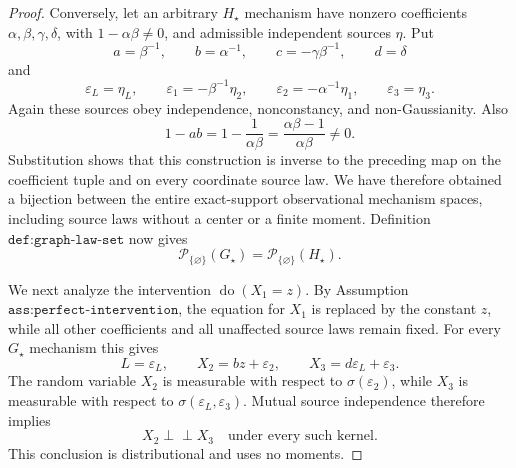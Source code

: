 \documentclass{article}
\begin{document}
\begin{proof}
Conversely, let an arbitrary \(H_\star\) mechanism have nonzero coefficients \(\alpha,\beta,\gamma,\delta\), with \(1-\alpha\beta\ne0\), and admissible independent sources \(\eta\). Put
\[
 a=\beta^{-1},\qquad b=\alpha^{-1},\qquad
 c=-\gamma\beta^{-1},\qquad d=\delta
\]
and
\[
 \varepsilon_L=\eta_L,\qquad
 \varepsilon_1=-\beta^{-1}\eta_2,\qquad
 \varepsilon_2=-\alpha^{-1}\eta_1,\qquad
 \varepsilon_3=\eta_3.
\]
Again these sources obey independence, nonconstancy, and non-Gaussianity. Also
\[
 1-ab=1-\frac{1}{\alpha\beta}
 =\frac{\alpha\beta-1}{\alpha\beta}\ne0.
\]
Substitution shows that this construction is inverse to the preceding map on the coefficient tuple and on every coordinate source law. We have therefore obtained a bijection between the entire exact-support observational mechanism spaces, including source laws without a center or a finite moment. Definition \(\texttt{def:graph-law-set}\) now gives
\[
 \mathcal P_{\{\varnothing\}}(G_\star)
 =\mathcal P_{\{\varnothing\}}(H_\star).
\]

We next analyze the intervention \(\operatorname{do}(X_1=z)\). By Assumption \(\texttt{ass:perfect-intervention}\), the equation for \(X_1\) is replaced by the constant \(z\), while all other coefficients and all unaffected source laws remain fixed. For every \(G_\star\) mechanism this gives
\[
 L=\varepsilon_L,\qquad
 X_2=bz+\varepsilon_2,\qquad
 X_3=d\varepsilon_L+\varepsilon_3.
\]
The random variable \(X_2\) is measurable with respect to \(\sigma(\varepsilon_2)\), while \(X_3\) is measurable with respect to \(\sigma(\varepsilon_L,\varepsilon_3)\). Mutual source independence therefore implies
\[
 X_2\mathbin{\perp\!\!\!\perp}X_3
 \quad\text{under every such kernel}.
\]
This conclusion is distributional and uses no moments.


\end{proof}
\end{document}
